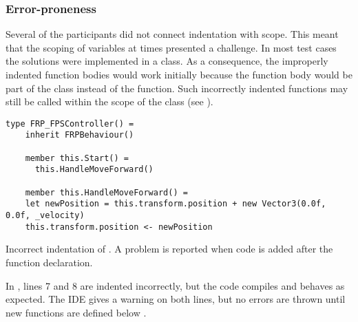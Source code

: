 \subsubsection{Error-proneness}
Several of the participants did not connect indentation with scope. This meant that the scoping of variables at times presented a challenge. In most test cases the solutions were implemented in a class. As a consequence, the improperly indented function bodies would work initially because the function body would be part of the class instead of the function. Such incorrectly indented functions may still be called within the scope of the class (see ).

\begin{listing}[H]
\begin{verbatim}
type FRP_FPSController() =
    inherit FRPBehaviour()

    member this.Start() =
      this.HandleMoveForward()

    member this.HandleMoveForward() =
    let newPosition = this.transform.position + new Vector3(0.0f, 0.0f, _velocity)
    this.transform.position <- newPosition
\end{verbatim}
\caption{Incorrect indentation of . A problem is reported when code is added after the function declaration.}
\label{lst:scope-prob}
\end{listing}

In , lines 7 and 8 are indented incorrectly, but the code compiles and behaves as expected. The \gls{IDE} gives a warning on both lines, but no errors are thrown until new  functions are defined below .
